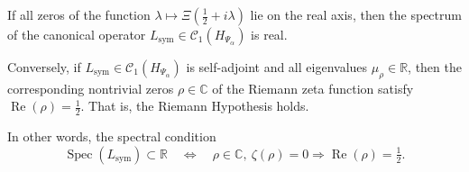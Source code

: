 \begin{lemma}
\label{lem:reality_of_spectrum_and_rh}
If all zeros of the function \( \lambda \mapsto \Xi(\tfrac{1}{2} + i\lambda) \) lie on the real axis, then the spectrum of the canonical operator \( L_{\mathrm{sym}} \in \mathcal{C}_1(H_{\Psi_\alpha}) \) is real.

Conversely, if \( L_{\mathrm{sym}} \in \mathcal{C}_1(H_{\Psi_\alpha}) \) is self-adjoint and all eigenvalues \( \mu_\rho \in \mathbb{R} \), then the corresponding nontrivial zeros \( \rho \in \mathbb{C} \) of the Riemann zeta function satisfy \( \operatorname{Re}(\rho) = \tfrac{1}{2} \). That is, the Riemann Hypothesis holds.

\medskip

\noindent
In other words, the spectral condition
\[
\operatorname{Spec}(L_{\mathrm{sym}}) \subset \mathbb{R}
\quad \Longleftrightarrow \quad
\rho \in \mathbb{C},\ \zeta(\rho) = 0 \Rightarrow \operatorname{Re}(\rho) = \tfrac{1}{2}.
\]
\end{lemma}
